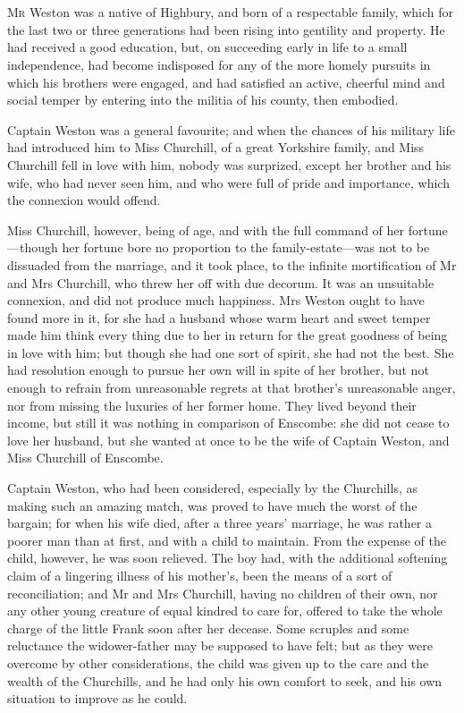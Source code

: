 \chapter[Chapter \thechapter]{}
\lettrine[lines=4,lraise=0.3]{M}{r} Weston was a native of Highbury, and born of a respectable family, which for the last two or three generations had been rising into gentility and property. He had received a good education, but, on succeeding early in life to a small independence, had become indisposed for any of the more homely pursuits in which his brothers were engaged, and had satisfied an active, cheerful mind and social temper by entering into the militia of his county, then embodied.

Captain Weston was a general favourite; and when the chances of his military life had introduced him to Miss Churchill, of a great Yorkshire family, and Miss Churchill fell in love with him, nobody was surprized, except her brother and his wife, who had never seen him, and who were full of pride and importance, which the connexion would offend.

Miss Churchill, however, being of age, and with the full command of her fortune—though her fortune bore no proportion to the family-estate—was not to be dissuaded from the marriage, and it took place, to the infinite mortification of Mr and Mrs Churchill, who threw her off with due decorum. It was an unsuitable connexion, and did not produce much happiness. Mrs Weston ought to have found more in it, for she had a husband whose warm heart and sweet temper made him think every thing due to her in return for the great goodness of being in love with him; but though she had one sort of spirit, she had not the best. She had resolution enough to pursue her own will in spite of her brother, but not enough to refrain from unreasonable regrets at that brother's unreasonable anger, nor from missing the luxuries of her former home. They lived beyond their income, but still it was nothing in comparison of Enscombe: she did not cease to love her husband, but she wanted at once to be the wife of Captain Weston, and Miss Churchill of Enscombe.

Captain Weston, who had been considered, especially by the Churchills, as making such an amazing match, was proved to have much the worst of the bargain; for when his wife died, after a three years' marriage, he was rather a poorer man than at first, and with a child to maintain. From the expense of the child, however, he was soon relieved. The boy had, with the additional softening claim of a lingering illness of his mother's, been the means of a sort of reconciliation; and Mr and Mrs Churchill, having no children of their own, nor any other young creature of equal kindred to care for, offered to take the whole charge of the little Frank soon after her decease. Some scruples and some reluctance the widower-father may be supposed to have felt; but as they were overcome by other considerations, the child was given up to the care and the wealth of the Churchills, and he had only his own comfort to seek, and his own situation to improve as he could.

